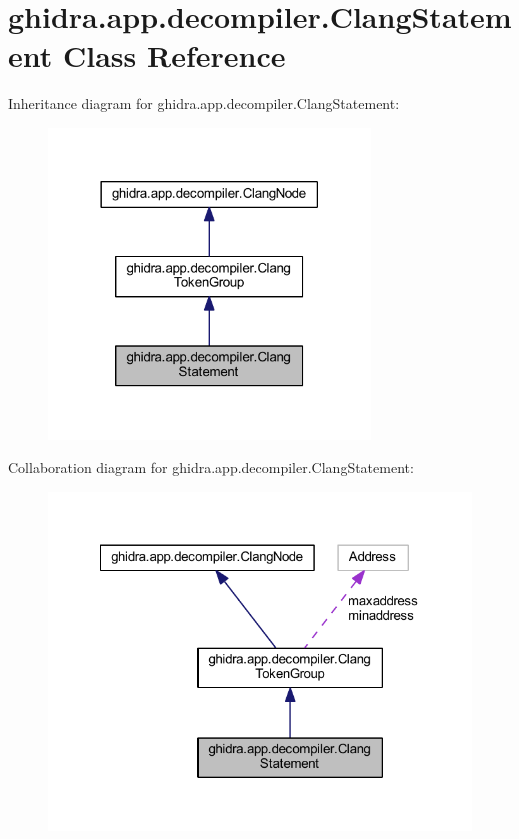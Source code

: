 \hypertarget{classghidra_1_1app_1_1decompiler_1_1_clang_statement}{}\section{ghidra.\+app.\+decompiler.\+Clang\+Statement Class Reference}
\label{classghidra_1_1app_1_1decompiler_1_1_clang_statement}


Inheritance diagram for ghidra.\+app.\+decompiler.\+Clang\+Statement\+:
\nopagebreak
\begin{figure}[H]
\begin{center}
\leavevmode
\includegraphics[width=242pt]{classghidra_1_1app_1_1decompiler_1_1_clang_statement__inherit__graph}
\end{center}
\end{figure}


Collaboration diagram for ghidra.\+app.\+decompiler.\+Clang\+Statement\+:
\nopagebreak
\begin{figure}[H]
\begin{center}
\leavevmode
\includegraphics[width=322pt]{classghidra_1_1app_1_1decompiler_1_1_clang_statement__coll__graph}
\end{center}
\end{figure}
